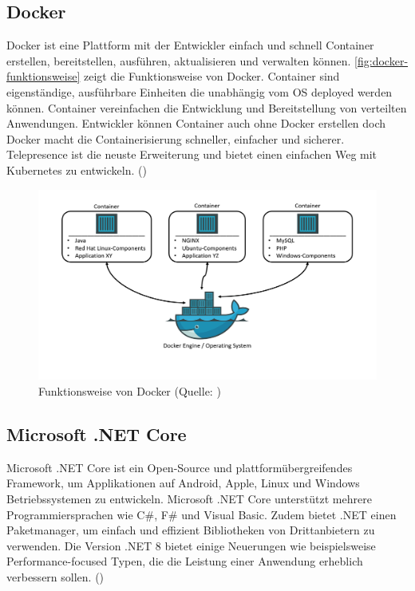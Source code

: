 \documentclass[a4paper, fontsize=11pt, parskip=half, twoside]{scrreprt}
\begin{document}
	\subsection{Docker}
	Docker ist eine Plattform mit der Entwickler einfach und schnell Container erstellen, bereitstellen, ausführen, aktualisieren und verwalten können.
	\autoref{fig:docker-funktionsweise} zeigt die Funktionsweise von Docker.
	Container sind eigenständige, ausführbare Einheiten die unabhängig vom OS deployed werden können.
	Container vereinfachen die Entwicklung und Bereitstellung von verteilten Anwendungen. 
	Entwickler können Container auch ohne Docker erstellen doch Docker macht die Containerisierung schneller, einfacher und sicherer. 
	Telepresence ist die neuste Erweiterung und bietet einen einfachen Weg mit Kubernetes zu entwickeln. (\textcite{ghosh_docker_2020})
	
	\begin{figure}[ht]
		\centering
		\includegraphics[scale=0.4]{assets/docker-funktionsweise.png}
		\caption{Funktionsweise von Docker (Quelle: \textcite{bollhoff_kubernetes_2022})}
		\label{fig:docker-funktionsweise}
	\end{figure}
	
	\subsection{Microsoft .NET Core} \label{subsec:msNetCore}
	Microsoft .NET Core ist ein Open-Source und plattformübergreifendes Framework, um Applikationen auf Android, Apple, Linux und Windows Betriebssystemen zu entwickeln.
	Microsoft .NET Core unterstützt mehrere Programmiersprachen wie C\#, F\# und Visual Basic.
	Zudem bietet .NET einen Paketmanager, um einfach und effizient Bibliotheken von Drittanbietern zu verwenden.
	Die Version .NET 8 bietet einige Neuerungen wie beispielsweise Performance-focused Typen, die die Leistung einer Anwendung erheblich verbessern sollen. (\textcite{billwagner_net_nodate})
\end{document}
